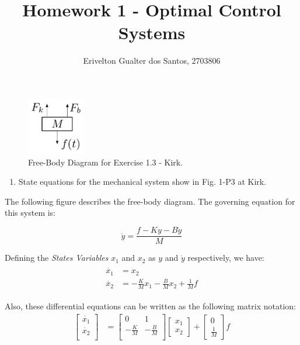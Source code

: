 \documentclass{article}
\begin{document}
\title{Homework 1 - Optimal Control Systems}
\author{Erivelton Gualter dos Santos, 2703806}
\date{}

\maketitle 

\begin{figure}
\includegraphics [width=1in]{output}
\caption{Free-Body Diagram for Exercise 1.3 - Kirk.}
\end{figure} 

\begin{enumerate}[label=(\alph*)]
\item State equations for the mechanical system show in Fig. 1-P3 at Kirk.
\end{enumerate}

The following figure describes the free-body diagram. The governing equation for this system is:

\begin{equation*}
\ddot{y} = \frac{f - Ky - B\dot{y}}{M}
\end{equation*}

Defining the \textit{States Variables} $x_1$ and $x_2$ as $y$ and $\dot{y}$ respectively, we have: 
\begin{eqnarray}\label{i1}
\begin{split}
	\dot{x_1} &= x_2 \\
	\dot{x_2} &= -\frac{K}{M}x_1 -\frac{B}{M}x_2 +\frac{1}{M}f
\end{split}
\end{eqnarray}

Also, these differential equations can be written as the following matrix notation:
\begin{eqnarray*}
\begin{bmatrix} 
	\dot{x_1} \\ 
	\dot{x_2} \\
\end{bmatrix} &= 
\begin{bmatrix} 
    0  &   1 \\
    -\frac{K}{M}  &  -\frac{B}{M} \\
\end{bmatrix} 
\begin{bmatrix}
	x_1 \\
	x_2 
\end{bmatrix} +
\begin{bmatrix}
	0 \\ \frac{1}{M}
\end{bmatrix}f 
\end{eqnarray*}
 
\end{document}
